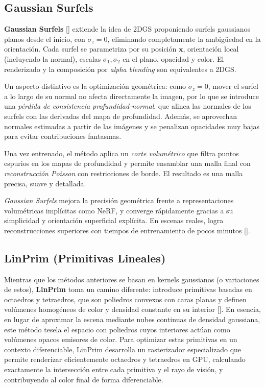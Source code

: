 \subsection{Gaussian Surfels}

\textbf{Gaussian Surfels} [\cite*{dai2024highqualitysurfacereconstructionusing}] extiende la idea de 2DGS proponiendo surfels gaussianos planos desde el inicio, con $\sigma_z = 0$, eliminando completamente la ambigüedad en la orientación. Cada surfel se parametriza por su posición $\mathbf{x}$, orientación local (incluyendo la normal), escalas $\sigma_1, \sigma_2$ en el plano, opacidad y color. El renderizado y la composición por \textit{alpha blending} son equivalentes a 2DGS.

Un aspecto distintivo es la optimización geométrica: como $\sigma_z = 0$, mover el surfel a lo largo de su normal no afecta directamente la imagen, por lo que se introduce una \textit{pérdida de consistencia profundidad-normal}, que alinea las normales de los surfels con las derivadas del mapa de profundidad. Además, se aprovechan normales estimadas a partir de las imágenes y se penalizan opacidades muy bajas para evitar contribuciones fantasmas.

Una vez entrenado, el método aplica un \textit{corte volumétrico} que filtra puntos espurios en los mapas de profundidad y permite ensamblar una malla final con \textit{reconstrucción Poisson} con restricciones de borde. El resultado es una malla precisa, suave y detallada.

\textit{Gaussian Surfels} mejora la precisión geométrica frente a representaciones volumétricas implícitas como NeRF, y converge rápidamente gracias a su simplicidad y orientación superficial explícita. En escenas reales, logra reconstrucciones superiores con tiempos de entrenamiento de pocos minutos [\cite{dai2024highqualitysurfacereconstructionusing}].

\subsection{LinPrim (Primitivas Lineales)}

Mientras que los métodos anteriores se basan en kernels gaussianos (o variaciones de estos), \textbf{LinPrim} toma un camino diferente: introduce primitivas basadas en octaedros y tetraedros, que son poliedros convexos con caras planas y definen volúmenes homogéneos de color y densidad constante en su interior [\cite{von2025linprim}]. En esencia, en lugar de aproximar la escena mediante nubes continuas de densidad gaussiana, este método tesela el espacio con poliedros cuyos interiores actúan como volúmenes opacos emisores de color. Para optimizar estas primitivas en un contexto diferenciable, LinPrim desarrolla un rasterizador especializado que permite renderizar eficientemente octaedros y tetraedros en GPU, calculando exactamente la intersección entre cada primitiva y el rayo de visión, y contribuyendo al color final de forma diferenciable.

